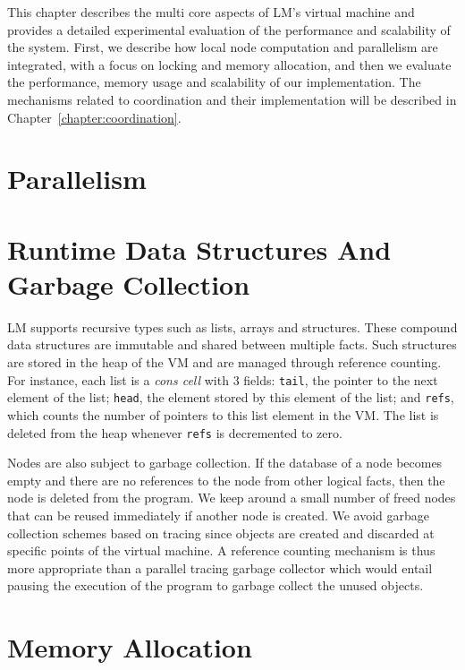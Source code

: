 This chapter describes the multi core aspects of LM's virtual machine and
provides a detailed experimental evaluation of the performance and scalability
of the system. First, we describe how local node computation and parallelism are
integrated, with a focus on locking and memory allocation, and then we evaluate
the performance, memory usage and scalability of our implementation. The
mechanisms related to coordination and their implementation will be described in
Chapter~\ref{chapter:coordination}.

\section{Parallelism}\label{sec:implementation:parallelism}



\section{Runtime Data Structures And Garbage Collection}

LM supports recursive types such as lists, arrays and structures. These compound
data structures are immutable and shared between multiple facts. Such structures
are stored in the heap of the VM and are managed through reference counting. For
instance, each list is a \emph{cons cell} with 3 fields: \texttt{tail}, the
pointer to the next element of the list; \texttt{head}, the element stored by
this element of the list; and \texttt{refs}, which counts the number of pointers
to this list element in the VM. The list is deleted from the heap whenever
\texttt{refs} is decremented to zero.

Nodes are also subject to garbage collection. If the database of a node becomes
empty and there are no references to the node from other logical facts, then the
node is deleted from the program. We keep around a small number of freed nodes
that can be reused immediately if another node is created. We avoid garbage
collection schemes based on tracing since objects are created and discarded at
specific points of the virtual machine. A reference counting mechanism is thus
more appropriate than a parallel tracing garbage collector which would entail
pausing the execution of the program to garbage collect the unused objects.

\section{Memory Allocation}\label{section:implementation:allocation}


